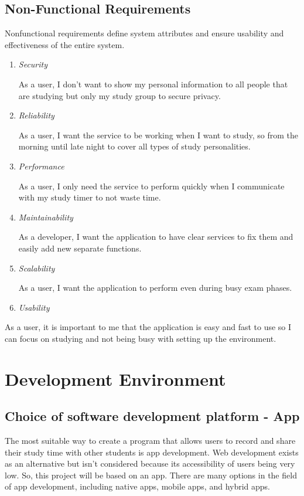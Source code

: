 \documentclass[conference]{IEEEtran}
\begin{document}
\subsection{Non-Functional Requirements}

Nonfunctional requirements define system attributes and ensure usability and effectiveness of the entire system. 

\begin{enumerate}
\item \textit{Security}

As a user, I don’t want to show my personal information to all people that are studying but only my study group to secure privacy.
\item \textit{Reliability}

As a user, I want the service to be working when I want to study, so from the morning until late night to cover all types of study personalities.
\item \textit{Performance}

As a user, I only need the service to perform quickly when I communicate with my study timer to not waste time. 
\item \textit{Maintainability}

As a developer, I want the application to have clear services to fix them and easily add new separate functions.
\item \textit{Scalability}

As a user, I want the application to perform even during busy exam phases.
\item \textit{Usability}
\end{enumerate}

As a user, it is important to me that the application is easy and fast to use so I can focus on studying and not being busy with setting up the environment.

\section{Development Environment}

\subsection{Choice of software development platform - App}\label{AA}
The most suitable way to create a program that allows users to record and share their study time with other students is app development. Web development exists as an alternative but isn't considered because its accessibility of users being very low. So, this project will be based on an app. There are many options in the field of app development, including native apps, mobile apps, and hybrid apps.
\end{document}
